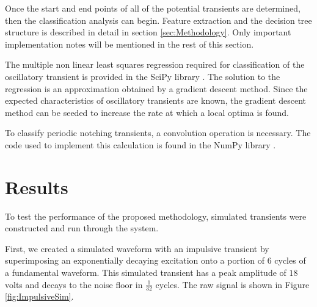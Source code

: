 \documentclass[10pt, conference, compsocconf]{IEEEtran}
\begin{document}
Once the start and end points of all of the potential transients are determined, then the classification analysis can begin. Feature extraction and the decision tree structure is described in detail in section \ref{sec:Methodology}. Only important implementation notes will be mentioned in the rest of this section.

The multiple non linear least squares regression required for classification of the oscillatory transient is provided in the SciPy library \cite{scipy:2019}. The solution to the regression is an approximation obtained by a gradient descent method. Since the expected characteristics of oscillatory transients are known, the gradient descent method can be seeded to increase the rate at which a local optima is found.

To classify periodic notching transients, a convolution operation is necessary. The code used to implement this calculation is found in the NumPy library \cite{numpy}.

\section{Results}
\label{sec:Results}
To test the performance of the proposed methodology, simulated transients were constructed and run through the system.

First, we created a simulated waveform with an impulsive transient by superimposing an exponentially decaying excitation onto a portion of $6$ cycles of a fundamental waveform. This simulated transient has a peak amplitude of $18$ volts and decays to the noise floor in $\frac{1}{32}$ cycles. The raw signal is shown in Figure \ref{fig:ImpulsiveSim}.
\end{document}
